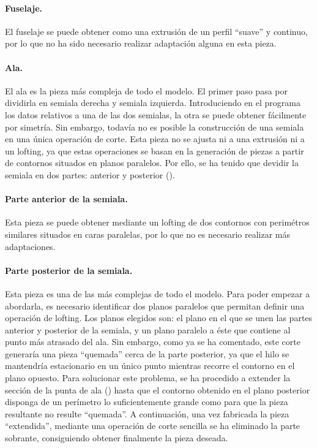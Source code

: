 \paragraph{Fuselaje.} El fuselaje se puede obtener como una extrusión de un perfil “suave” y continuo, por lo que no ha sido necesario realizar adaptación alguna en esta pieza.

\paragraph{Ala.} El ala es la pieza más compleja de todo el modelo. El primer paso pasa por dividirla en semiala derecha y semiala izquierda. Introduciendo en el programa los datos relativos a una de las dos semialas, la otra se puede obtener fácilmente por simetría. Sin embargo, todavía no es posible la construcción de una semiala en una única operación de corte. Esta pieza no se ajusta ni a una extrusión ni a un lofting, ya que estas operaciones se basan en la generación de piezas a partir de contornos situados en planos paralelos. Por ello, se ha tenido que devidir la semiala en dos partes: anterior y posterior ().

\paragraph{Parte anterior de la semiala.} Esta pieza se puede obtener mediante un lofting de dos contornos con perimétros similares situados en caras paralelas, por lo que no es necesario realizar más adaptaciones.

\paragraph{Parte posterior de la semiala.} Esta pieza es una de las más complejas de todo el modelo. Para poder empezar a abordarla, es necesario identificar dos planos paralelos que permitan definir una operación de lofting. Los planos elegidos son: el plano en el que se unen las partes anterior y posterior de la semiala, y un plano paralelo a éste que contiene al punto más atrasado del ala. Sin embargo, como ya se ha comentado, este corte generaría una pieza “quemada” cerca de la parte posterior, ya que el hilo se mantendría estacionario en un único punto mientras recorre el contorno en el plano opuesto. Para solucionar este problema, se ha procedido a extender la sección de la punta de ala () hasta que el contorno obtenido en el plano posterior disponga de un perímetro lo suficientemente grande como para que la pieza resultante no resulte “quemada”. A continuación, una vez fabricada la pieza “extendida”, mediante una operación de corte sencilla se ha eliminado la parte sobrante, consiguiendo obtener finalmente la pieza deseada.

